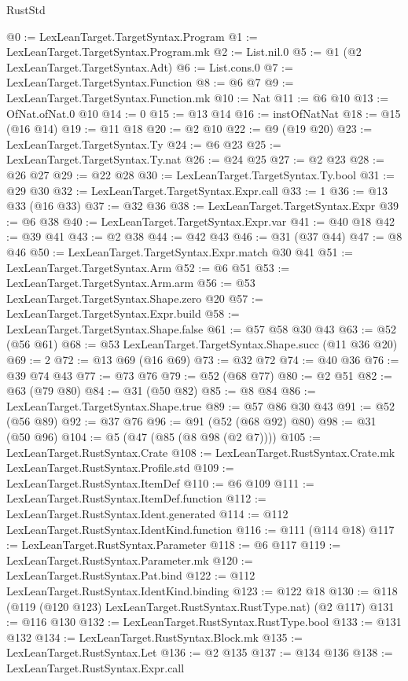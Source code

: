 \begin{lexlean}{RustStd}
\begin{coremodule}
@0 := LexLeanTarget.TargetSyntax.Program
@1 := LexLeanTarget.TargetSyntax.Program.mk
@2 := List.nil.{0}
@5 := @1 (@2 LexLeanTarget.TargetSyntax.Adt)
@6 := List.cons.{0}
@7 := LexLeanTarget.TargetSyntax.Function
@8 := @6 @7
@9 := LexLeanTarget.TargetSyntax.Function.mk
@10 := Nat
@11 := @6 @10
@13 := OfNat.ofNat.{0} @10
@14 := 0
@15 := @13 @14
@16 := instOfNatNat
@18 := @15 (@16 @14)
@19 := @11 @18
@20 := @2 @10
@22 := @9 (@19 @20)
@23 := LexLeanTarget.TargetSyntax.Ty
@24 := @6 @23
@25 := LexLeanTarget.TargetSyntax.Ty.nat
@26 := @24 @25
@27 := @2 @23
@28 := @26 @27
@29 := @22 @28
@30 := LexLeanTarget.TargetSyntax.Ty.bool
@31 := @29 @30
@32 := LexLeanTarget.TargetSyntax.Expr.call
@33 := 1
@36 := @13 @33 (@16 @33)
@37 := @32 @36
@38 := LexLeanTarget.TargetSyntax.Expr
@39 := @6 @38
@40 := LexLeanTarget.TargetSyntax.Expr.var
@41 := @40 @18
@42 := @39 @41
@43 := @2 @38
@44 := @42 @43
@46 := @31 (@37 @44)
@47 := @8 @46
@50 := LexLeanTarget.TargetSyntax.Expr.match @30 @41
@51 := LexLeanTarget.TargetSyntax.Arm
@52 := @6 @51
@53 := LexLeanTarget.TargetSyntax.Arm.arm
@56 := @53 LexLeanTarget.TargetSyntax.Shape.zero @20
@57 := LexLeanTarget.TargetSyntax.Expr.build
@58 := LexLeanTarget.TargetSyntax.Shape.false
@61 := @57 @58 @30 @43
@63 := @52 (@56 @61)
@68 := @53 LexLeanTarget.TargetSyntax.Shape.succ (@11 @36 @20)
@69 := 2
@72 := @13 @69 (@16 @69)
@73 := @32 @72
@74 := @40 @36
@76 := @39 @74 @43
@77 := @73 @76
@79 := @52 (@68 @77)
@80 := @2 @51
@82 := @63 (@79 @80)
@84 := @31 (@50 @82)
@85 := @8 @84
@86 := LexLeanTarget.TargetSyntax.Shape.true
@89 := @57 @86 @30 @43
@91 := @52 (@56 @89)
@92 := @37 @76
@96 := @91 (@52 (@68 @92) @80)
@98 := @31 (@50 @96)
@104 := @5 (@47 (@85 (@8 @98 (@2 @7))))
@105 := LexLeanTarget.RustSyntax.Crate
@108 := LexLeanTarget.RustSyntax.Crate.mk LexLeanTarget.RustSyntax.Profile.std
@109 := LexLeanTarget.RustSyntax.ItemDef
@110 := @6 @109
@111 := LexLeanTarget.RustSyntax.ItemDef.function
@112 := LexLeanTarget.RustSyntax.Ident.generated
@114 := @112 LexLeanTarget.RustSyntax.IdentKind.function
@116 := @111 (@114 @18)
@117 := LexLeanTarget.RustSyntax.Parameter
@118 := @6 @117
@119 := LexLeanTarget.RustSyntax.Parameter.mk
@120 := LexLeanTarget.RustSyntax.Pat.bind
@122 := @112 LexLeanTarget.RustSyntax.IdentKind.binding
@123 := @122 @18
@130 := @118 (@119 (@120 @123) LexLeanTarget.RustSyntax.RustType.nat) (@2 @117)
@131 := @116 @130
@132 := LexLeanTarget.RustSyntax.RustType.bool
@133 := @131 @132
@134 := LexLeanTarget.RustSyntax.Block.mk
@135 := LexLeanTarget.RustSyntax.Let
@136 := @2 @135
@137 := @134 @136
@138 := LexLeanTarget.RustSyntax.Expr.call

\end{coremodule}
\end{lexlean}
